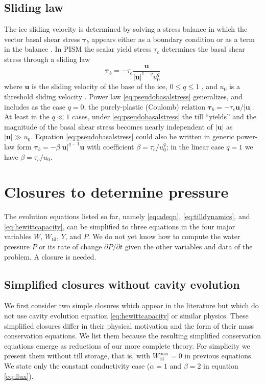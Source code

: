 \documentclass[gmd]{copernicus}   %
\newcommand{\text}{\textrm}
\newcommand{\Wtil}{W_{\text{til}}}
\newcommand{\Wtilmax}{W_{\text{til}}^{\text{max}}}
\begin{document}
\subsection{Sliding law}  The ice sliding velocity is determined by solving a stress balance in which the vector basal shear stress $\boldsymbol\tau_b$ appears either as a boundary condition \citep{SchoofCoulombBlatter} or as a term in the balance \citep{SchoofStream,BBssasliding}.  In PISM the scalar yield stress $\tau_c$ determines the basal shear stress through a sliding law
\begin{equation}
\boldsymbol\tau_b = - \tau_c \frac{\mathbf{u}}{|\mathbf{u}|^{1-q} u_0^q} \label{eq:pseudobasalstress}
\end{equation}
where $\mathbf{u}$ is the sliding velocity of the base of the ice, $0\le q \le 1$ , and $u_0$ is a threshold sliding velocity \citep{AschwandenAdalgeirsdottirKhroulev}.  Power law \eqref{eq:pseudobasalstress} generalizes, and includes as the case $q=0$, the purely-plastic (Coulomb) relation $\boldsymbol\tau_b = - \tau_c \mathbf{u}/|\mathbf{u}|$.  At least in the $q\ll 1$ cases, under \eqref{eq:pseudobasalstress} the till ``yields'' and the magnitude of the basal shear stress becomes nearly independent of $|\mathbf{u}|$ as $|\mathbf{u}| \gg u_0$.  Equation \eqref{eq:pseudobasalstress} could also be written in generic power-law form $\boldsymbol\tau_b = - \beta |\mathbf{u}|^{q-1} \mathbf{u}$ with coefficient $\beta = \tau_c / u_0^q$; in the linear case $q=1$ we have $\beta = \tau_c/u_0$.


\section{Closures to determine pressure} \label{sec:closures}

The evolution equations listed so far, namely \eqref{eq:adeqn}, \eqref{eq:tilldynamics}, and \eqref{eq:hewittcapacity}, can be simplified to three equations in the four major variables $W$, $\Wtil$, $Y$, and $P$.  We do not yet know how to compute the water pressure $P$ or its rate of change $\partial P/\partial t$ given the other variables and data of the problem.  A closure is needed.

\subsection{Simplified closures without cavity evolution}  We first consider two simple closures which appear in the literature but which do not use cavity evolution equation \eqref{eq:hewittcapacity} or similar physics.  These simplified closures differ in their physical motivation and the form of their mass conservation equations.  We list them because the resulting simplified conservation equations emerge as reductions of our more complete theory.  For simplicity we present them without till storage, that is, with $\Wtilmax=0$ in previous equations.  We state only the constant conductivity case ($\alpha=1$ and $\beta=2$ in equation \eqref{eq:flux}).
\end{document}
